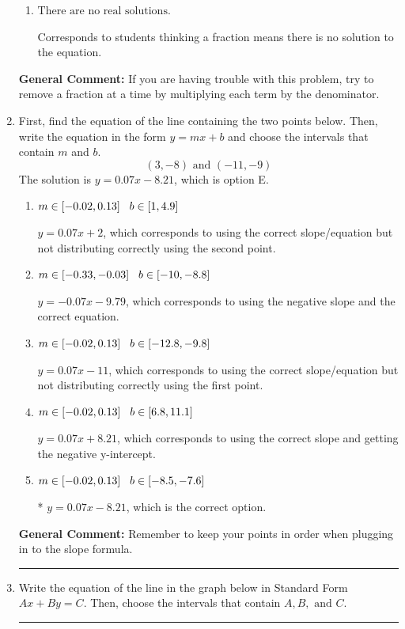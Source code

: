 \documentclass{extbook}[14pt]
\newcommand{\litem}[1]{\item #1

\rule{\textwidth}{0.4pt}}
\begin{document}
\begin{enumerate}
{\begin{enumerate}[label=\Alph*.]
 $x = 2.079$, which corresponds to not distributing the negative in front of the second fraction.
\item \( \text{There are no real solutions.} \)

Corresponds to students thinking a fraction means there is no solution to the equation.
\end{enumerate}

\textbf{General Comment:} If you are having trouble with this problem, try to remove a fraction at a time by multiplying each term by the denominator.
}
\litem{
First, find the equation of the line containing the two points below. Then, write the equation in the form $ y=mx+b $ and choose the intervals that contain $m$ and $b$.
\[ (3, -8) \text{ and } (-11, -9) \]The solution is \( y = 0.07x -8.21 \), which is option E.\begin{enumerate}[label=\Alph*.]
\item \( m \in [-0.02, 0.13] \hspace*{3mm} b \in [1, 4.9] \)

 $y = 0.07x + 2$, which corresponds to using the correct slope/equation but not distributing correctly using the second point.
\item \( m \in [-0.33, -0.03] \hspace*{3mm} b \in [-10, -8.8] \)

 $y = -0.07x -9.79$, which corresponds to using the negative slope and the correct equation.
\item \( m \in [-0.02, 0.13] \hspace*{3mm} b \in [-12.8, -9.8] \)

 $y = 0.07x -11$, which corresponds to using the correct slope/equation but not distributing correctly using the first point.
\item \( m \in [-0.02, 0.13] \hspace*{3mm} b \in [6.8, 11.1] \)

 $y = 0.07x + 8.21$, which corresponds to using the correct slope and getting the negative y-intercept.
\item \( m \in [-0.02, 0.13] \hspace*{3mm} b \in [-8.5, -7.6] \)

* $y = 0.07x -8.21$, which is the correct option.
\end{enumerate}

\textbf{General Comment:} Remember to keep your points in order when plugging in to the slope formula.
}
\litem{
Write the equation of the line in the graph below in Standard Form $Ax+By=C$. Then, choose the intervals that contain $A, B, \text{ and } C$.

}
\end{enumerate}
\end{document}
